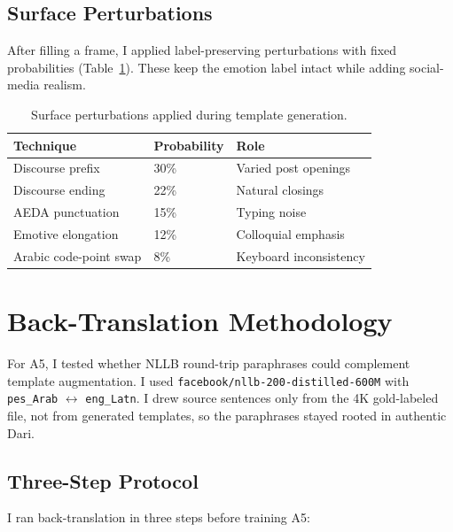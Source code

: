 \documentclass[11pt,a4paper]{article}
\begin{document}
\subsection{Surface Perturbations}

After filling a frame, I applied label-preserving perturbations with fixed probabilities (Table~\ref{tab:perturbations}). These keep the emotion label intact while adding social-media realism.

\begin{table}[H]
\centering
\caption{Surface perturbations applied during template generation.}
\label{tab:perturbations}
\begin{tabular}{@{}lll@{}}
\toprule
Technique & Probability & Role \\
\midrule
Discourse prefix       & 30\% & Varied post openings \\
Discourse ending       & 22\% & Natural closings \\
AEDA punctuation       & 15\% & Typing noise \\
Emotive elongation     & 12\% & Colloquial emphasis \\
Arabic code-point swap &  8\% & Keyboard inconsistency \\
\bottomrule
\end{tabular}
\end{table}

\section{Back-Translation Methodology}
\label{sec:bt}

For A5, I tested whether NLLB round-trip paraphrases could complement template augmentation. I used \texttt{facebook/nllb-200-distilled-600M} with \texttt{pes\_Arab} $\leftrightarrow$ \texttt{eng\_Latn}. I drew source sentences only from the 4K gold-labeled file, not from generated templates, so the paraphrases stayed rooted in authentic Dari.

\subsection{Three-Step Protocol}

I ran back-translation in three steps before training A5:
\end{document}
